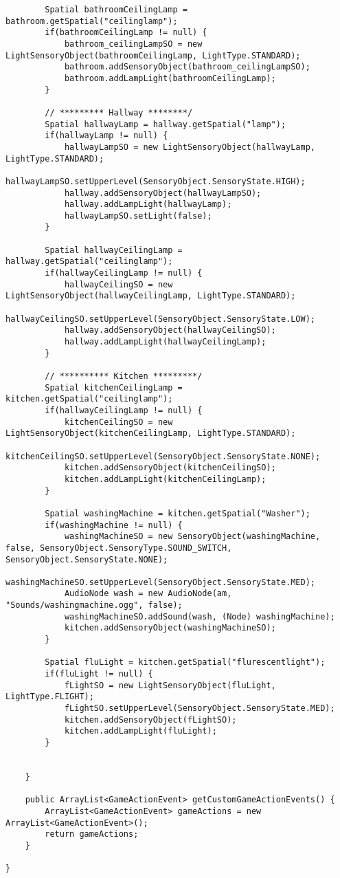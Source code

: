 \begin{lstlisting}
        Spatial bathroomCeilingLamp = bathroom.getSpatial("ceilinglamp");
        if(bathroomCeilingLamp != null) {
            bathroom_ceilingLampSO = new LightSensoryObject(bathroomCeilingLamp, LightType.STANDARD);
            bathroom.addSensoryObject(bathroom_ceilingLampSO);
            bathroom.addLampLight(bathroomCeilingLamp);
        }
        
        // ********* Hallway ********/
        Spatial hallwayLamp = hallway.getSpatial("lamp");
        if(hallwayLamp != null) {
            hallwayLampSO = new LightSensoryObject(hallwayLamp, LightType.STANDARD);
            hallwayLampSO.setUpperLevel(SensoryObject.SensoryState.HIGH);
            hallway.addSensoryObject(hallwayLampSO);
            hallway.addLampLight(hallwayLamp);
            hallwayLampSO.setLight(false);
        }       
        
        Spatial hallwayCeilingLamp = hallway.getSpatial("ceilinglamp");
        if(hallwayCeilingLamp != null) {
            hallwayCeilingSO = new LightSensoryObject(hallwayCeilingLamp, LightType.STANDARD); 
            hallwayCeilingSO.setUpperLevel(SensoryObject.SensoryState.LOW);
            hallway.addSensoryObject(hallwayCeilingSO);
            hallway.addLampLight(hallwayCeilingLamp);
        } 
        
        // ********** Kitchen *********/
        Spatial kitchenCeilingLamp = kitchen.getSpatial("ceilinglamp");
        if(hallwayCeilingLamp != null) {
            kitchenCeilingSO = new LightSensoryObject(kitchenCeilingLamp, LightType.STANDARD); 
            kitchenCeilingSO.setUpperLevel(SensoryObject.SensoryState.NONE);
            kitchen.addSensoryObject(kitchenCeilingSO);
            kitchen.addLampLight(kitchenCeilingLamp);
        } 
        
        Spatial washingMachine = kitchen.getSpatial("Washer");
        if(washingMachine != null) {
            washingMachineSO = new SensoryObject(washingMachine, false, SensoryObject.SensoryType.SOUND_SWITCH, SensoryObject.SensoryState.NONE);
            washingMachineSO.setUpperLevel(SensoryObject.SensoryState.MED);
            AudioNode wash = new AudioNode(am, "Sounds/washingmachine.ogg", false);
            washingMachineSO.addSound(wash, (Node) washingMachine);
            kitchen.addSensoryObject(washingMachineSO);
        }
        
        Spatial fluLight = kitchen.getSpatial("flurescentlight");
        if(fluLight != null) {
            fLightSO = new LightSensoryObject(fluLight, LightType.FLIGHT);
            fLightSO.setUpperLevel(SensoryObject.SensoryState.MED);
            kitchen.addSensoryObject(fLightSO);
            kitchen.addLampLight(fluLight);
        }
        
        
    }
    
    public ArrayList<GameActionEvent> getCustomGameActionEvents() {
        ArrayList<GameActionEvent> gameActions = new ArrayList<GameActionEvent>();
        return gameActions;
    }
    
}

\end{lstlisting}

